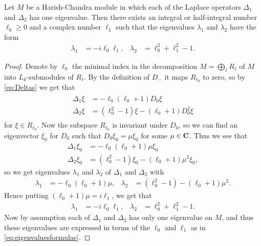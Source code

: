 \begin{proposition}\label{prop:indecomposabledecomposition}
  Let $M$ be a Harish-Chandra module in which each of the Laplace operators $\Delta_1$ and $\Delta_2$ has one eigenvalue. Then there exists an integral or half-integral number $\ell_0\geq 0$ and a complex number $\ell_1$ such that the eigenvalues $\lambda_1$ and $\lambda_2$ have the form
  \begin{align}\label{eq:eigenvaluesformulae}
    \lambda_1 &= -i\ell_0\ell_1, & \lambda_2 &= \ell_0^2 + \ell_1^2 - 1.
  \end{align}
\end{proposition}
\begin{proof}
  Denote by $\ell_0$ the minimal index in the decomposition $M=\bigoplus_\ell R_\ell$ of $M$ into $L_k$-submodules of $R_\ell$. By the definition of $D_-$ it maps $R_{\ell_0}$ to zero, so by \cref{eq:Deltas} we get that
  \begin{align}\label{eq:Deltastemp}
    \begin{aligned}
      \Delta_1 \xi &= -\ell_0(\ell_0+1)D_0\xi \\
      \Delta_2 \xi &= (\ell_0^2-1)\xi - (\ell_0+1)D_0^2\xi
    \end{aligned}
  \end{align}
  for $\xi\in R_{\ell_0}$. Now the subspace $R_{\ell_0}$ is invariant under $D_0$, so we can find an eigenvector $\xi_0$ for $D_0$ such that $D_0\xi_0 = \mu\xi_0$ for some $\mu\in\mathbf{C}$. Thus we see that
  \begin{align*}
    \Delta_1 \xi_0 &= -\ell_0(\ell_0+1)\mu\xi_0 \\
    \Delta_2 \xi_0 &= (\ell_0^2-1)\xi_0 - (\ell_0+1)\mu^2\xi_0,
  \end{align*}
  so we get eigenvalues $\lambda_1$ and $\lambda_2$ of $\Delta_1$ and $\Delta_2$ with
  \begin{align*}
    \lambda_1 &= -\ell_0(\ell_0+1)\mu, & \lambda_2 &= (\ell_0^2-1) - (\ell_0+1)\mu^2.
  \end{align*}
  Hence putting $(\ell_0+1)\mu = i\ell_1$, we get that
  \begin{align*}
    \lambda_1 &= -i\ell_0\ell_1, & \lambda_2 &= \ell_0^2 + \ell_1^2 - 1.
  \end{align*}
  Now by assumption each of $\Delta_1$ and $\Delta_2$ has only one eigenvalue on $M$, and thus these eigenvalues are expressed in terms of the $\ell_0$ and $\ell_1$ as in \cref{eq:eigenvaluesformulae}. 
\end{proof}

